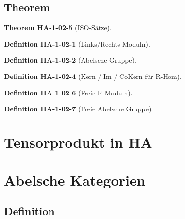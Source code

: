 \documentclass[10pt, letterpaper]{article}
\newcommand{\CustomHeading}[3]{%
  \par\medskip\noindent%
  \textbf{#1 #2} \textnormal{(#3)}.\enskip%
}
\newenvironment{DEF}[2]{\CustomHeading{Definition}{#1}{#2}}{}
\newenvironment{THEO}[2]{\CustomHeading{Theorem}{#1}{#2}}{}
\begin{document}
\subsection{Theorem}



\begin{THEO}{HA-1-02-5}{ISO-Sätze}

\end{THEO}





\begin{DEF}{HA-1-02-1}{Links/Rechts Moduln}

\end{DEF}

\begin{DEF}{HA-1-02-2}{Abelsche Gruppe}

\end{DEF}

\begin{DEF}{HA-1-02-4}{Kern / Im / CoKern für R-Hom}

\end{DEF}

\begin{DEF}{HA-1-02-6}{Freie R-Moduln}

\end{DEF}

\begin{DEF}{HA-1-02-7}{Freie Abelsche Gruppe}

\end{DEF}














\section{Tensorprodukt in HA}




\section{Abelsche Kategorien}

\subsection{Definition}
\end{document}
